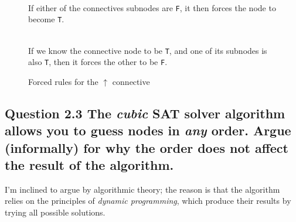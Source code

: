 \begin{figure}[H]
\begin{multicols}{3}
\\
	If either of the connectives subnodes are {\tt F}, it then forces the
	node to become {\tt T}.
	
	\vfill
	\columnbreak
	
	\\
	If we know the connective node to be {\tt T}, and one of its subnodes is
	also {\tt T}, then it forces the other to be {\tt F}.
	
	\end{multicols}
	\label{fig:uparrow-forced-rules}
	\caption{Forced rules for the $\uparrow$ connective}
\end{figure}

\subsection*{Question 2.3 \mdseries The {\it cubic} SAT solver algorithm
allows you to guess nodes in {\it any} order. Argue (informally) for why the
order does not affect the result of the algorithm.}
I'm inclined to argue by algorithmic theory; the reason is that the algorithm
relies on the principles of {\it dynamic programming}, which produce their
results by trying all possible solutions.
